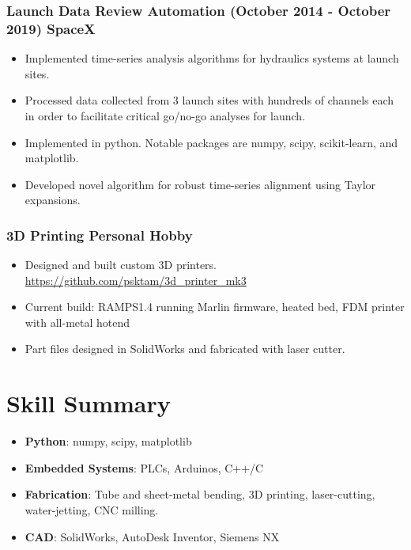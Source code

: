 \documentclass[11pt]{article}
\begin{document}
    \subsubsection*{Launch Data Review Automation
                    (October 2014 - October 2019) \hfill SpaceX}
        \begin{itemize}
            \setlength\itemsep{-0.5em}
            \item Implemented time-series analysis algorithms for hydraulics
                  systems at launch sites.
            \item Processed data collected from 3 launch sites with hundreds
                  of channels each in order to facilitate critical go/no-go
                  analyses for launch.
            \item Implemented in python. Notable packages are
                  numpy, scipy, scikit-learn, and matplotlib.
            \item Developed novel algorithm for robust time-series alignment 
                  using Taylor expansions.
        \end{itemize}

\subsubsection*{3D Printing \hfill Personal Hobby}
    \begin{itemize}
        \setlength\itemsep{-0.5em}
        \item  Designed and built custom 3D printers.
               \url{https://github.com/psktam/3d_printer_mk3}
        \item Current build: RAMPS1.4 running Marlin firmware, heated bed,
              FDM printer with all-metal hotend
        \item Part files designed in SolidWorks and fabricated with laser
              cutter.
    \end{itemize}

\section*{Skill Summary}
    \begin{itemize}
        \setlength\itemsep{-0.5em}
        \item \textbf{Python}: numpy, scipy, matplotlib
        \item \textbf{Embedded Systems}: PLCs, Arduinos, C++/C
        \item \textbf{Fabrication}: Tube and sheet-metal bending, 
              3D printing, laser-cutting, water-jetting, CNC milling.
        \item \textbf{CAD}: SolidWorks, AutoDesk Inventor, Siemens NX
    \end{itemize}
\end{document}
